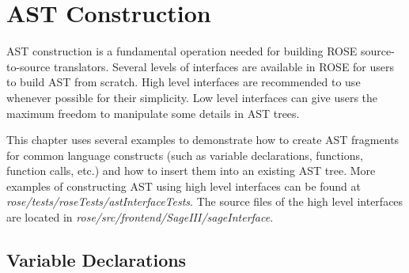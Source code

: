 \clearpage
\chapter{AST Construction}
AST construction is a fundamental operation needed for building ROSE
source-to-source translators. Several levels of interfaces are available in
ROSE for users to build AST from scratch. 
High level interfaces are recommended to use whenever possible for their
simplicity. Low level interfaces can give users the maximum freedom to
manipulate some details in AST trees.


This chapter uses several examples to demonstrate how to 
create AST fragments for common language
constructs (such as variable declarations, functions, function calls, etc.)
  and how to insert them into an existing AST tree.
More examples of constructing AST using high level interfaces can be found at
\textit{rose/tests/roseTests/astInterfaceTests}. 
The source files of the high level interfaces are located in
\textit{rose/src/frontend/SageIII/sageInterface}.

\section{Variable Declarations}

